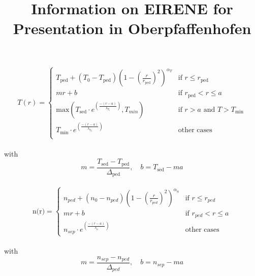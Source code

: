 \documentclass{article}
\title{Information on EIRENE for Presentation in Oberpfaffenhofen}
\begin{document}
	\begin{equation*}
		T(r) =
		\begin{cases}
			T_{\textrm{ped}} + (T_0 - T_{\textrm{ped}}) \left(1 - \left(\frac{r}{r_{\textrm{ped}}} \right)^2 \right)^{\alpha_T} &\textrm{if $r \le r_{\textrm{ped}}$}\\
			mr + b & \textrm{if $r_{\textrm{ped}} < r \le a$}\\
			\textrm{max}\left(T_{\textrm{sed}} \cdot e^{\left( \frac{-(r-a)}{\lambda_{T_1}} \right)} , T_{min} \right) & \textrm{if $r > a$ and $T > T_{\textrm{min}}$}\\
			T_{\textrm{min}} \cdot e^{\left( \frac{-(r-a)}{\lambda_{T_2}} \right)} & \textrm{other cases} \\
		\end{cases}
	\end{equation*}
	~\\
	with \\
	\begin{equation*}
		m = \frac{T_{\textrm{sed}} - T_{\textrm{ped}}}{\Delta_{\textrm{ped}}}, \quad b = T_{\textrm{sed}} - ma
	\end{equation*}	
	~\\
	\begin{equation*}
		\text{n(r)} =
		\begin{cases}
			n_{ped} + (n_0 - n_{ped}) \left(1 - \left(\frac{r}{r_{ped}}\right)^2 \right)^{\alpha_n} & \textrm{if $r \le r_{ped}$}\\
			mr + b & \textrm{if $r_{ped} < r \le a$} \\
			n_{sep} \cdot e^{\left(\frac{-(r-a)}{\lambda_n}\right)} & \textrm{other cases}
		\end{cases}
	\end{equation*}
	~\\
	with\\
	\begin{equation*}
	m = \frac{n_{sep} - n_{ped}}{\Delta_{ped}}, \quad b = n_{sep} - ma
	\end{equation*}
	
\end{document}
